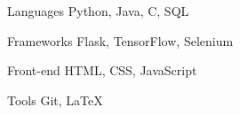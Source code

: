 

\begin{cvskills}


  \cvskill
    {Languages} %
    {Python, Java, C, SQL} %

  \cvskill
    {Frameworks} %
    {Flask, TensorFlow, Selenium} %

  \cvskill
    {Front-end} %
    {HTML, CSS, JavaScript} %

  \cvskill
    {Tools} %
    {Git, LaTeX} %

\end{cvskills}
